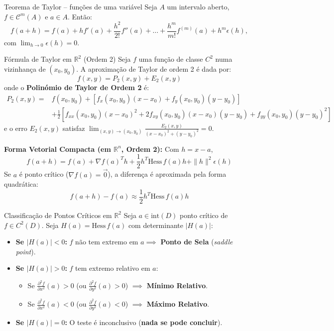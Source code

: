 \documentclass[11pt,a4paper]{article}
\newcommand{\R}{\mathbb{R}}
\begin{document}
\noindent\begin{theorembox}{Teorema de Taylor -- funções de uma variável}
  Seja $A$ um intervalo aberto, $f \in \mathcal{C}^m(A)$ e $a \in A$. Então:
  \[ f(a+h) = f(a) + hf'(a) + \frac{h^2}{2!}f''(a) + \dots + \frac{h^m}{m!}f^{(m)}(a) + h^m\epsilon(h), \]
  com $\lim_{h\to0} \epsilon(h) = 0$.
\end{theorembox}

\noindent\begin{theorembox}{Fórmula de Taylor em $\R^2$ (Ordem 2)}
  Seja $f$ uma função de classe $C^2$ numa vizinhança de $(x_0, y_0)$. A aproximação de Taylor de ordem 2 é dada por:
  \[ f(x, y) = P_2(x, y) + E_2(x, y) \]
  onde o \textbf{Polinómio de Taylor de Ordem 2} é:
  \[ \begin{aligned}
    P_2(x, y) = {} & f(x_0, y_0) + \left[ f_x(x_0,y_0)(x-x_0) + f_y(x_0,y_0)(y-y_0) \right] \\
    & + \frac{1}{2} \left[ f_{xx}(x_0,y_0)(x-x_0)^2 + 2f_{xy}(x_0,y_0)(x-x_0)(y-y_0) + f_{yy}(x_0,y_0)(y-y_0)^2 \right]
  \end{aligned} \]
  e o erro $E_2(x, y)$ satisfaz $\lim_{(x,y) \to (x_0,y_0)} \frac{E_2(x,y)}{(x-x_0)^2 + (y-y_0)^2} = 0$.
  
  \vspace{3pt}
  \textbf{Forma Vetorial Compacta (em $\R^n$, Ordem 2):} Com $h = x - a$,
  \[ f(a+h) = f(a) + \nabla f(a)^T h + \frac{1}{2} h^T \text{Hess}\,f(a) h + \|h\|^2\epsilon(h) \]
  Se $a$ é ponto crítico ($\nabla f(a) = \vec{0}$), a diferença é aproximada pela forma quadrática:
  \[ f(a+h) - f(a) \approx \frac{1}{2} h^T \text{Hess}\,f(a) h \]
\end{theorembox}

\noindent\begin{formulabox}{Classificação de Pontos Críticos em $\R^2$}
  Seja $a \in \text{int}(D)$ ponto crítico de $f \in C^2(D)$. Seja $H(a) = \text{Hess}\,f(a)$ com determinante $|H(a)|$:
  \begin{itemize}
    \item \textbf{Se $|H(a)| < 0$:} $f$ não tem extremo em $a \implies$ \textbf{Ponto de Sela} (\textit{saddle point}).
    \item \textbf{Se $|H(a)| > 0$:} $f$ tem extremo relativo em $a$:
      \begin{itemize}
        \item Se $\frac{\partial^2 f}{\partial x^2}(a) > 0$ (ou $\frac{\partial^2 f}{\partial y^2}(a) > 0$) $\implies$ \textbf{Mínimo Relativo}.
        \item Se $\frac{\partial^2 f}{\partial x^2}(a) < 0$ (ou $\frac{\partial^2 f}{\partial y^2}(a) < 0$) $\implies$ \textbf{Máximo Relativo}.
      \end{itemize}
    \item \textbf{Se $|H(a)| = 0$:} O teste é inconclusivo (\textbf{nada se pode concluir}).
  \end{itemize}
\end{formulabox}
\end{document}
